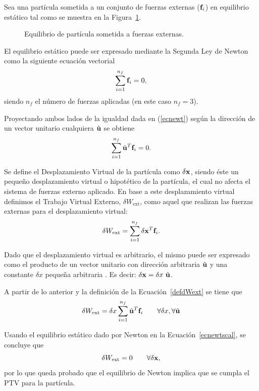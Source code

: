 Sea una partícula sometida a un conjunto de fuerzas externas (${\bf f}_i$) en equilibrio estático tal como se muestra en la Figura~\ref{fig:PTVpart}. %

\begin{figure}[htb]
	\centering
\def\svgwidth{0.35\textwidth}

	\caption{Equilibrio de partícula sometida a fuerzas externas.}
	\label{fig:PTVpart}
\end{figure}

El equilibrio estático puede ser expresado mediante la Segunda Ley de Newton como la siguiente ecuación vectorial
%
\begin{equation}\label{ecnewt}
\sum_{i=1}^{n_f} {\bf f}_i = 0,
\end{equation}
%
siendo $n_f$ el número de fuerzas aplicadas (en este caso $n_f=3$).

Proyectando ambos lados de la igualdad dada en (\ref{ecnewt}) según la dirección de un vector unitario cualquiera $\hat{{\bf u}}$ se obtiene
%
\begin{equation}\label{ecnewtscal}
\sum_{i=1}^{n_f} \hat{{\bf u}}^T {\bf f}_i = 0.
\end{equation}

Se define el Desplazamiento Virtual de la partícula como $\delta {\bf x}$, siendo éste un pequeño desplazamiento virtual o hipotético de la partícula, el cual no afecta el sistema de fuerzas externo aplicado. En base a este desplazamiento virtual definimos el Trabajo Virtual Externo, $\delta W_{\text{ext}}$, como aquel que realizan las fuerzas externas para el desplazamiento virtual:
%
\begin{equation}\label{defdWext}
\delta W_{\text{ext}} = \sum_{i=1}^{n_f} \delta {\bf x}^T {\bf f}_i.
\end{equation}

Dado que el desplazamiento virtual es arbitrario, el mismo puede ser expresado como el producto de un vector unitario con dirección arbitraria $\hat{{\bf u}}$ y una constante $\delta x$ pequeña arbitraria . Es decir: $\delta {\bf x} = \delta x \text{ }\hat{{\bf u}}$.

A partir de lo anterior y la definición de la Ecuación~\eqref{defdWext} se tiene que
%
\begin{equation}
\delta W_{\text{ext}} = \delta x \sum_{i=1}^{n_f} \hat{{\bf u}}^T {\bf f}_i  \qquad \forall \delta x, \forall \hat{{\bf u}}
\end{equation}

Usando el equilibrio estático dado por Newton en la Ecuación~\eqref{ecnewtscal}, se concluye que
%
\begin{equation}\label{PTV_part}
\delta W_{\text{ext}} = 0 \qquad  \forall \delta{\bf x},
\end{equation}
%
por lo que queda probado que el equilibrio de Newton implica que se cumpla el PTV para la partícula.

